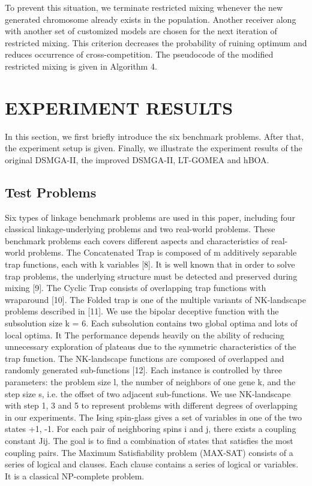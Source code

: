 \documentclass{sig-alternate-05-2015}
\begin{document}
To prevent this situation, we terminate restricted mixing whenever the new generated chromosome already exists in the population. Another receiver along with another set of customized models are chosen for the next iteration of restricted mixing. This criterion decreases the probability of ruining optimum and reduces occurrence of cross-competition. The pseudocode of the modified restricted mixing is given in Algorithm 4.








\section{EXPERIMENT RESULTS}
In this section, we first briefly introduce the six benchmark problems. After that, the experiment setup is given. Finally, we illustrate the experiment results of the original DSMGA-II, the improved DSMGA-II, LT-GOMEA and hBOA. 


\subsection{Test Problems}
 Six types of linkage benchmark problems are used in this paper, including four classical linkage-underlying problems and two real-world problems. These benchmark problems each covers different aspects and characteristics of real-world problems. The Concatenated Trap is composed of m additively separable trap functions, each with k variables [8]. It is well known that in order to solve trap problems, the underlying structure must be detected and preserved during mixing [9]. The Cyclic Trap consists of overlapping trap functions with wraparound [10]. The Folded trap is one of the multiple variants of NK-landscape problems described in [11]. We use the bipolar deceptive function with the subsolution size k = 6. Each subsolution contains two global optima and lots of local optima. It The performance depends heavily on the ability of reducing unnecessary exploration of plateaus due to the symmetric characteristics of the trap function. The NK-landscape functions are composed of overlapped and randomly generated sub-functions [12]. Each instance is controlled by three parameters: the problem size l, the number of neighbors of one gene k, and the step size s, i.e. the offset of two adjacent sub-functions. We use NK-landscape with step 1, 3 and 5 to represent problems with different degrees of overlapping in our experiments. The Ising spin-glass gives a set of variables in one of the two states {+1, -1}. For each pair of neighboring spins i and j, there exists a coupling constant Jij. The goal is to find a combination of states that satisfies the most coupling pairs. The Maximum Satisfiability problem (MAX-SAT) consists of a series of logical and clauses. Each clause contains a series of logical or variables. It is a classical NP-complete problem.  
\end{document}
